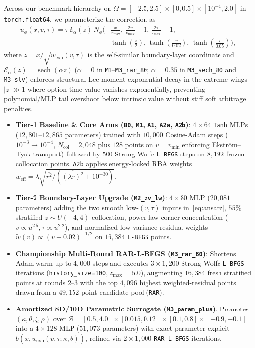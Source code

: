 \documentclass[11pt,a4paper]{article}
\begin{document}
Across our benchmark hierarchy on $\Omega = [-2.5, 2.5] \times [0, 0.5] \times [10^{-4}, 2.0]$ in \texttt{torch.float64}, we parameterize the correction as
\begin{equation}
\begin{split}
  u_\phi(x, v, \tau) = \tau\,\mathcal{E}_\alpha(z)\,N_\phi\!\Big(&\frac{x}{x_{\max}},\, \frac{2v}{v_{\max}} - 1,\, \frac{2\tau}{\tau_{\max}} - 1,\\
  &\tanh\!\left(\frac{z}{2}\right),\, \tanh\!\left(\frac{v}{0.02}\right),\, \tanh\!\left(\frac{\tau}{0.05}\right)\!\Big),
\end{split}
  \label{eq:ansatz}
\end{equation}
where $z = x/\sqrt{w_{\mathrm{exp}}(v,\tau)}$ is the self-similar boundary-layer coordinate and $\mathcal{E}_\alpha(z) = \operatorname{sech}(\alpha z)$ ($\alpha = 0$ in \texttt{M1}--\texttt{M3\_rar\_80}; $\alpha = 0.35$ in \texttt{M3\_sech\_80} and \texttt{M3\_slv}) enforces structural Lee-moment exponential decay \cite{lee2004moment} in the extreme wings $|z| \gg 1$ where option time value vanishes exponentially, preventing polynomial/MLP tail overshoot below intrinsic value without stiff soft arbitrage penalties.

\begin{itemize}
  \item \textbf{Tier-1 Baseline \& Core Arms (\texttt{B0}, \texttt{M1}, \texttt{A1}, \texttt{A2a}, \texttt{A2b})}: $4\times 64$ \texttt{Tanh} MLPs ($12{,}801\text{--}12{,}865$ parameters) trained with $10{,}000$ Cosine-Adam steps ($10^{-3}\to 10^{-4}$, $N_{\mathrm{col}} = 2{,}048$ plus $128$ points on $v = v_{\min}$ enforcing Ekstr\"om--Tysk transport) followed by $500$ Strong-Wolfe \texttt{L-BFGS} steps on $8{,}192$ frozen collocation points. \texttt{A2b} applies energy-locked RBA weights $w_{\mathrm{eff}} = \lambda\sqrt{\overline{r^2}/(\overline{(\lambda r)^2} + 10^{-30})}$.
  \item \textbf{Tier-2 Boundary-Layer Upgrade (\texttt{M2\_zv\_lw})}: $4\times 80$ MLP ($20{,}081$ parameters) adding the two smooth low-$(v,\tau)$ inputs in~\eqref{eq:ansatz}, $55\%$ stratified $z \sim U(-4, 4)$ collocation, power-law corner concentration ($v \propto u^{2.5}, \tau \propto u^{2.2}$), and normalized low-variance residual weights $\tilde{w}(v) \propto (v + 0.02)^{-1/2}$ on $16{,}384$ \texttt{L-BFGS} points.
  \item \textbf{Championship Multi-Round RAR-L-BFGS (\texttt{M3\_rar\_80})}: Shortens Adam warm-up to $4{,}000$ steps and executes $3 \times 1{,}200$ Strong-Wolfe \texttt{L-BFGS} iterations (\texttt{history\_size=100}, $z_{\max} = 5.0$), augmenting $16{,}384$ fresh stratified points at rounds 2--3 with the top $4{,}096$ highest weighted-residual points drawn from a $49{,}152$-point candidate pool (\texttt{RAR}).
  \item \textbf{Amortized 8D/10D Parametric Surrogate (\texttt{M3\_param\_plus})}: Promotes $(\kappa, \theta, \xi, \rho)$ over $\mathcal{B} = [0.5, 4.0]\times[0.015, 0.12]\times[0.1, 0.8]\times[-0.9, -0.1]$ into a $4\times 128$ MLP ($51{,}073$ parameters) with exact parameter-explicit $b(x, w_{\mathrm{exp}}(v,\tau;\kappa,\theta))$, refined via $2 \times 1{,}000$ \texttt{RAR-L-BFGS} iterations.
\end{itemize}
\end{document}
